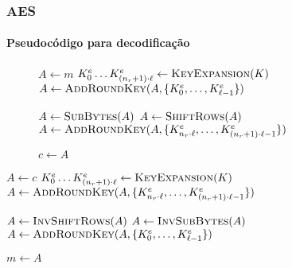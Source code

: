 \documentclass[12pt]{beamer}
\begin{document}
\begin{frame}
    \footnotesize
    \frametitle{AES}
    \framesubtitle{Pseudocódigo para decodificação}
        \begin{figure}[ht]
      \centering
      \begin{minipage}{.7\linewidth}
        \begin{algorithm}[H]
        
            $A \leftarrow m$\;
            $K^{e}_{0} \dots K^{e}_{(n_r + 1) \cdot \ell}
                \leftarrow \textsc{KeyExpansion}(K)$\;
            $A \leftarrow \textsc{AddRoundKey}(A,
                \{K^{e}_{0}, \dots, K^{e}_{\ell - 1}\})$\;
            
         
            $A \leftarrow \textsc{SubBytes}(A)$\;
            $A \leftarrow \textsc{ShiftRows}(A)$\;
            $A \leftarrow \textsc{AddRoundKey}(A,
                \{K^{e}_{n_r \cdot \ell}, \dots, K^{e}_{(n_r + 1) \cdot \ell - 1}\})$\;
        
            $c \leftarrow A$\;
        \end{algorithm}
      \end{minipage}
    \end{figure}
    \begin{algorithm}[H]
    
        $A \leftarrow c$\;
        $K^{e}_{0} \dots K^{e}_{(n_r + 1) \cdot \ell}
            \leftarrow \textsc{KeyExpansion}(K)$\;
        $A \leftarrow \textsc{AddRoundKey}(A,
            \{K^{e}_{n_r \cdot \ell}, \dots, K^{e}_{(n_r + 1) \cdot \ell - 1}\})$\;
        
     
        $A \leftarrow \textsc{InvShiftRows}(A)$\;
        $A \leftarrow \textsc{InvSubBytes}(A)$\;
        $A \leftarrow \textsc{AddRoundKey}(A,
            \{K^{e}_{0}, \dots, K^{e}_{\ell - 1}\})$\;
    
        $m \leftarrow A$\;
    \end{algorithm}
\end{frame}
\end{document}
